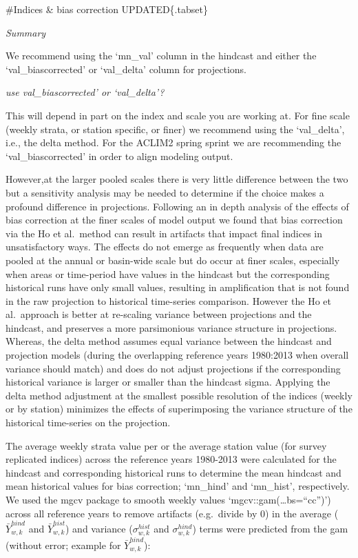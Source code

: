 \documentclass[
]{article}
\begin{document}
\#Indices \& bias correction UPDATED\{.tabset\}

\emph{Summary}

We recommend using the `mn\_val' column in the hindcast and either the
`val\_biascorrected' or `val\_delta' column for projections.

\emph{use val\_biascorrected' or `val\_delta'?}

This will depend in part on the index and scale you are working at. For
fine scale (weekly strata, or station specific, or finer) we recommend
using the `val\_delta', i.e., the delta method. For the ACLIM2 spring
sprint we are recommending the `val\_biascorrected' in order to align
modeling output.

However,at the larger pooled scales there is very little difference
between the two but a sensitivity analysis may be needed to determine if
the choice makes a profound difference in projections. Following an in
depth analysis of the effects of bias correction at the finer scales of
model output we found that bias correction via the Ho et al.~method can
result in artifacts that impact final indices in unsatisfactory ways.
The effects do not emerge as frequently when data are pooled at the
annual or basin-wide scale but do occur at finer scales, especially when
areas or time-period have values in the hindcast but the corresponding
historical runs have only small values, resulting in amplification that
is not found in the raw projection to historical time-series comparison.
However the Ho et al.~approach is better at re-scaling variance between
projections and the hindcast, and preserves a more parsimonious variance
structure in projections. Whereas, the delta method assumes equal
variance between the hindcast and projection models (during the
overlapping reference years 1980:2013 when overall variance should
match) and does do not adjust projections if the corresponding
historical variance is larger or smaller than the hindcast sigma.
Applying the delta method adjustment at the smallest possible resolution
of the indices (weekly or by station) minimizes the effects of
superimposing the variance structure of the historical time-series on
the projection.

The average weekly strata value per or the average station value (for
survey replicated indices) across the reference years 1980-2013 were
calculated for the hindcast and corresponding historical runs to
determine the mean hindcast and mean historical values for bias
correction; `mn\_hind' and `mn\_hist', respectively. We used the mgcv
package to smooth weekly values `mgcv::gam(\ldots bs=``cc'')') across
all reference years to remove artifacts (e.g.~divide by 0) in the
average (\(\bar{Y}^{hind}_{w,k}\) and \(\bar{Y}^{hist}_{w,k}\)) and
variance (\(\sigma^{hist}_{w,k}\) and \(\sigma^{hind}_{w,k}\)) terms
were predicted from the gam (without error; example for
\(\bar{Y}^{hind}_{w,k}\)):
\end{document}
